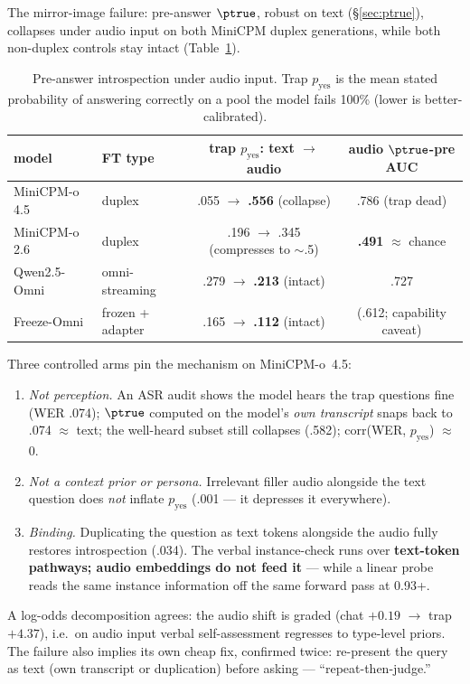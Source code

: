 The mirror-image failure: pre-answer $\ptrue$, robust on text
(\S\ref{sec:ptrue}), collapses under audio input on both MiniCPM duplex
generations, while both non-duplex controls stay intact
(Table~\ref{tab:audioptrue}).

\begin{table}[t]
\centering\small
\caption{Pre-answer introspection under audio input. Trap
$p_{\mathrm{yes}}$ is the mean stated probability of answering correctly on
a pool the model fails 100\% (lower is better-calibrated).}
\label{tab:audioptrue}
\begin{tabular}{llcc}
\toprule
model & FT type & trap $p_{\mathrm{yes}}$: text $\rightarrow$ audio & audio $\ptrue$-pre AUC \\
\midrule
MiniCPM-o 4.5 & duplex & .055 $\rightarrow$ \textbf{.556} (collapse) & .786 (trap dead) \\
MiniCPM-o 2.6 & duplex & .196 $\rightarrow$ .345 (compresses to $\sim$.5) & \textbf{.491} $\approx$ chance \\
Qwen2.5-Omni & omni-streaming & .279 $\rightarrow$ \textbf{.213} (intact) & .727 \\
Freeze-Omni & frozen + adapter & .165 $\rightarrow$ \textbf{.112} (intact) & (.612; capability caveat) \\
\bottomrule
\end{tabular}
\end{table}

Three controlled arms pin the mechanism on MiniCPM-o~4.5:
\begin{enumerate}
\item \emph{Not perception.} An ASR audit shows the model hears the trap
  questions fine (WER .074); $\ptrue$ computed on the model's \emph{own
  transcript} snaps back to .074 $\approx$ text; the well-heard subset still
  collapses (.582); corr(WER, $p_{\mathrm{yes}}$) $\approx$ 0.
\item \emph{Not a context prior or persona.} Irrelevant filler audio
  alongside the text question does \emph{not} inflate $p_{\mathrm{yes}}$
  (.001 --- it depresses it everywhere).
\item \emph{Binding.} Duplicating the question as text tokens alongside the
  audio fully restores introspection (.034). The verbal instance-check runs
  over \textbf{text-token pathways; audio embeddings do not feed it} ---
  while a linear probe reads the same instance information off the same
  forward pass at 0.93+.
\end{enumerate}
A log-odds decomposition agrees: the audio shift is graded (chat $+0.19$
$\rightarrow$ trap $+4.37$), i.e.\ on audio input verbal self-assessment
regresses to type-level priors. The failure also implies its own cheap fix,
confirmed twice: re-present the query as text (own transcript or
duplication) before asking --- ``repeat-then-judge.''

